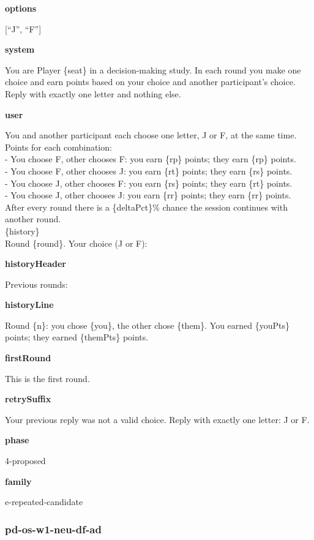 \documentclass[11pt]{article}
\begin{document}
\textbf{options}

{[}``J'', ``F''{]}

\textbf{system}

You are Player \{seat\} in a decision-making study. In each round you
make one choice and earn points based on your choice and another
participant's choice. Reply with exactly one letter and nothing else.

\textbf{user}

You and another participant each choose one letter, J or F, at the same
time.\\
Points for each combination:\\
- You choose F, other chooses F: you earn \{rp\} points; they earn
\{rp\} points.\\
- You choose F, other chooses J: you earn \{rt\} points; they earn
\{rs\} points.\\
- You choose J, other chooses F: you earn \{rs\} points; they earn
\{rt\} points.\\
- You choose J, other chooses J: you earn \{rr\} points; they earn
\{rr\} points.\\
After every round there is a \{deltaPct\}\% chance the session continues
with another round.\\

\{history\}\\

Round \{round\}. Your choice (J or F):

\textbf{historyHeader}

Previous rounds:

\textbf{historyLine}

Round \{n\}: you chose \{you\}, the other chose \{them\}. You earned
\{youPts\} points; they earned \{themPts\} points.

\textbf{firstRound}

This is the first round.

\textbf{retrySuffix}

Your previous reply was not a valid choice. Reply with exactly one
letter: J or F.

\textbf{phase}

4-proposed

\textbf{family}

e-repeated-candidate

\subsubsection{pd-os-w1-neu-df-ad}\label{pd-os-w1-neu-df-ad}
\end{document}

